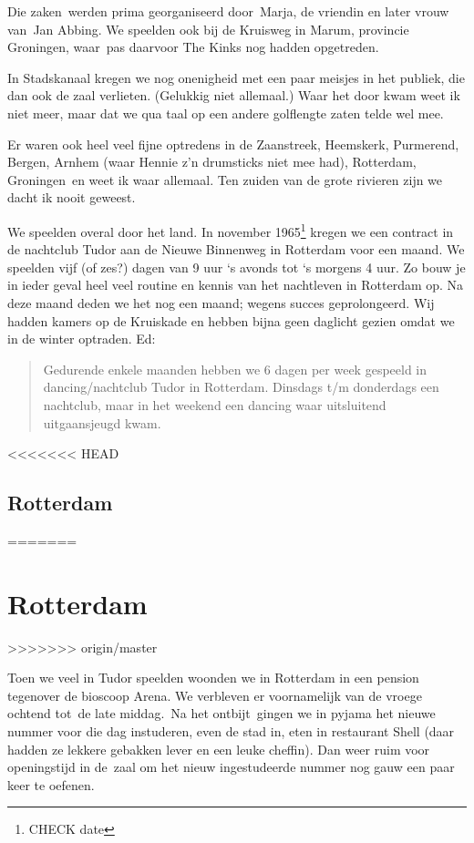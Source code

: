 \documentclass[10pt,twoside, openright]{memoir}
\begin{document}
Die zaken werden prima georganiseerd door Marja, de vriendin en later vrouw van Jan Abbing. We speelden ook bij de Kruisweg in Marum, provincie Groningen, waar pas daarvoor The Kinks nog hadden opgetreden.

In Stadskanaal kregen we nog onenigheid met een paar meisjes in het publiek, die dan ook de zaal verlieten. (Gelukkig niet allemaal.) Waar het door kwam weet ik niet meer, maar dat we qua taal op een andere golflengte zaten telde wel mee. 

Er waren ook heel veel fijne optredens in de Zaanstreek, Heemskerk, Purmerend, Bergen, Arnhem (waar Hennie z'n drumsticks niet mee had), Rotterdam, Groningen en weet ik waar allemaal. Ten zuiden van de grote rivieren zijn we dacht ik nooit geweest. 

We speelden overal door het land. In november 1965\footnote{CHECK date} kregen we een contract in de nachtclub Tudor aan de Nieuwe Binnenweg in Rotterdam voor een maand. We speelden vijf (of zes?) dagen van 9 uur `s avonds tot `s morgens 4 uur. Zo bouw je in ieder geval heel veel routine en kennis van het nachtleven in Rotterdam op. Na deze maand deden we het nog een maand; wegens succes geprolongeerd. Wij hadden kamers op de Kruiskade en hebben bijna geen daglicht gezien omdat we in de winter optraden. Ed: 

\begin{quote}
Gedurende enkele maanden hebben we 6 dagen per week gespeeld in dancing/nachtclub Tudor in Rotterdam. Dinsdags t/m donderdags een nachtclub, maar in het weekend een dancing waar uitsluitend uitgaansjeugd kwam.
\end{quote} 


<<<<<<< HEAD
\section{Rotterdam} %
=======
\chapter{Rotterdam} %
>>>>>>> origin/master
\label{cha:arena}

Toen we veel in Tudor speelden woonden we in Rotterdam in een pension tegenover de bioscoop Arena. We verbleven er voornamelijk van de vroege ochtend tot de late middag. Na het ontbijt gingen we in pyjama het nieuwe nummer voor die dag instuderen, even de stad in, eten in restaurant Shell (daar hadden ze lekkere gebakken lever en een leuke cheffin). Dan weer ruim voor openingstijd in de zaal om het nieuw ingestudeerde nummer nog gauw een paar keer te oefenen. 
\end{document}
